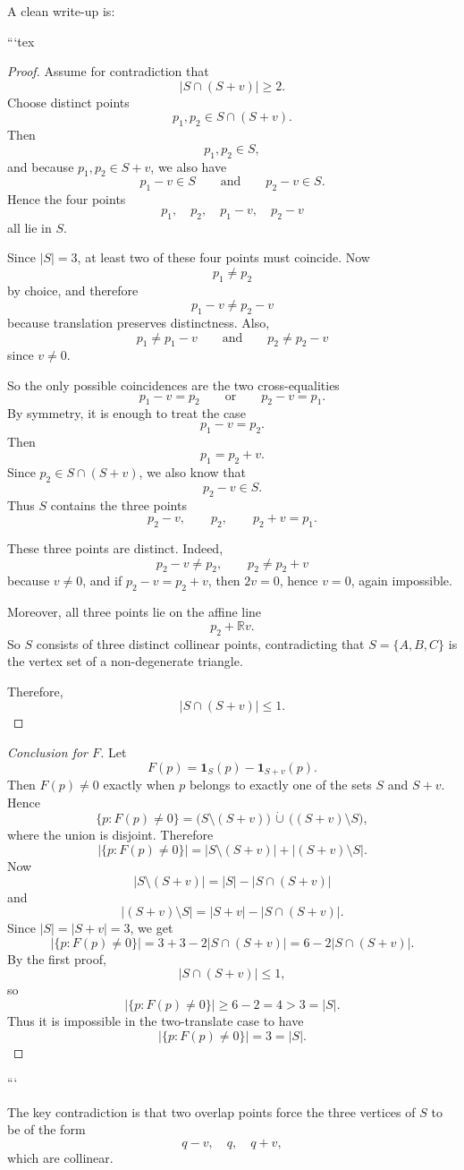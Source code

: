 A clean write-up is:

```tex
\begin{proof}
Assume for contradiction that
\[
|S\cap(S+v)|\ge 2.
\]
Choose distinct points
\[
p_1,p_2\in S\cap(S+v).
\]
Then
\[
p_1,p_2\in S,
\]
and because \(p_1,p_2\in S+v\), we also have
\[
p_1-v\in S
\qquad\text{and}\qquad
p_2-v\in S.
\]
Hence the four points
\[
p_1,\quad p_2,\quad p_1-v,\quad p_2-v
\]
all lie in \(S\).

Since \(|S|=3\), at least two of these four points must coincide. Now
\[
p_1\neq p_2
\]
by choice, and therefore
\[
p_1-v\neq p_2-v
\]
because translation preserves distinctness. Also,
\[
p_1\neq p_1-v
\qquad\text{and}\qquad
p_2\neq p_2-v
\]
since \(v\neq 0\).

So the only possible coincidences are the two cross-equalities
\[
p_1-v=p_2
\qquad\text{or}\qquad
p_2-v=p_1.
\]
By symmetry, it is enough to treat the case
\[
p_1-v=p_2.
\]
Then
\[
p_1=p_2+v.
\]
Since \(p_2\in S\cap(S+v)\), we also know that
\[
p_2-v\in S.
\]
Thus \(S\) contains the three points
\[
p_2-v,\qquad p_2,\qquad p_2+v=p_1.
\]

These three points are distinct. Indeed,
\[
p_2-v\neq p_2,\qquad p_2\neq p_2+v
\]
because \(v\neq 0\), and if \(p_2-v=p_2+v\), then \(2v=0\), hence \(v=0\), again impossible.

Moreover, all three points lie on the affine line
\[
p_2+\mathbb{R}v.
\]
So \(S\) consists of three distinct collinear points, contradicting that \(S=\{A,B,C\}\) is the vertex set of a non-degenerate triangle.

Therefore,
\[
|S\cap(S+v)|\le 1.
\]
\end{proof}

\begin{proof}[Conclusion for \(F\)]
Let
\[
F(p)=\mathbf{1}_S(p)-\mathbf{1}_{S+v}(p).
\]
Then \(F(p)\neq 0\) exactly when \(p\) belongs to exactly one of the sets \(S\) and \(S+v\). Hence
\[
\{p:F(p)\neq 0\}
=
\bigl(S\setminus(S+v)\bigr)\,\dot\cup\,\bigl((S+v)\setminus S\bigr),
\]
where the union is disjoint. Therefore
\[
|\{p:F(p)\neq 0\}|
=
|S\setminus(S+v)|+|(S+v)\setminus S|.
\]
Now
\[
|S\setminus(S+v)|=|S|-|S\cap(S+v)|
\]
and
\[
|(S+v)\setminus S|=|S+v|-|S\cap(S+v)|.
\]
Since \(|S|=|S+v|=3\), we get
\[
|\{p:F(p)\neq 0\}|
=
3+3-2|S\cap(S+v)|
=
6-2|S\cap(S+v)|.
\]
By the first proof,
\[
|S\cap(S+v)|\le 1,
\]
so
\[
|\{p:F(p)\neq 0\}|
\ge 6-2=4>3=|S|.
\]
Thus it is impossible in the two-translate case to have
\[
|\{p:F(p)\neq 0\}|=3=|S|.
\]
\end{proof}
```

The key contradiction is that two overlap points force the three vertices of \(S\) to be of the form
\[
q-v,\quad q,\quad q+v,
\]
which are collinear.
